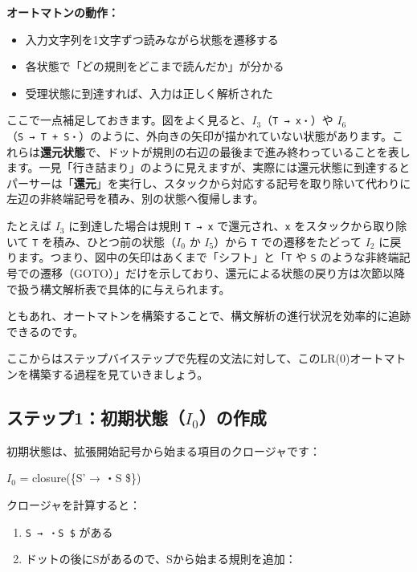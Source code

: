 \textbf{オートマトンの動作：}

\begin{itemize}
\tightlist
\item
  入力文字列を1文字ずつ読みながら状態を遷移する
\item
  各状態で「どの規則をどこまで読んだか」が分かる
\item
  受理状態に到達すれば、入力は正しく解析された
\end{itemize}

ここで一点補足しておきます。図をよく見ると、\(I_3\)（\texttt{T\ →\ x・}）や
\(I_6\)（\texttt{S\ →\ T\ +\ S・}）のように、外向きの矢印が描かれていない状態があります。これらは\textbf{還元状態}で、ドットが規則の右辺の最後まで進み終わっていることを表します。一見「行き詰まり」のように見えますが、実際には還元状態に到達するとパーサーは「\textbf{還元}」を実行し、スタックから対応する記号を取り除いて代わりに左辺の非終端記号を積み、別の状態へ復帰します。

たとえば \(I_3\) に到達した場合は規則 \texttt{T\ →\ x}
で還元され、\texttt{x} をスタックから取り除いて \texttt{T}
を積み、ひとつ前の状態（\(I_0\) か \(I_5\)）から \texttt{T}
での遷移をたどって \(I_2\)
に戻ります。つまり、図中の矢印はあくまで「シフト」と「\texttt{T} や
\texttt{S}
のような非終端記号での遷移（GOTO）」だけを示しており、還元による状態の戻り方は次節以降で扱う構文解析表で具体的に与えられます。

ともあれ、オートマトンを構築することで、構文解析の進行状況を効率的に追跡できるのです。

ここからはステップバイステップで先程の文法に対して、このLR(0)オートマトンを構築する過程を見ていきましょう。

\hypertarget{chapter5-ux30b9ux30c6ux30c3ux30d71ux521dux671fux72b6ux614bi_0ux306eux4f5cux6210}{%
\subsection{\texorpdfstring{ステップ1：初期状態（\(I_0\)）の作成}{ステップ1：初期状態（I\_0）の作成}}\label{chapter5-ux30b9ux30c6ux30c3ux30d71ux521dux671fux72b6ux614bi_0ux306eux4f5cux6210}}

初期状態は、拡張開始記号から始まる項目のクロージャです：

\(I_0\) = closure(\{S' → ・S \$\})

クロージャを計算すると：

\begin{enumerate}
\def\labelenumi{\arabic{enumi}.}
\tightlist
\item
  \texttt{S\textquotesingle{}\ →\ ・S\ \$} がある
\item
  ドットの後にSがあるので、Sから始まる規則を追加：
\end{enumerate}

